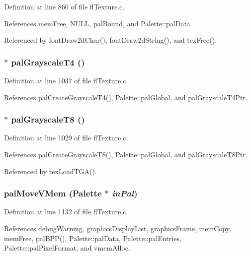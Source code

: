 Definition at line 860 of file fl\-Texture.c.

References mem\-Free, NULL, pal\-Bound, and Palette::pal\-Data.

Referenced by font\-Draw2d\-Char(), font\-Draw2d\-String(), and tex\-Free().
\subsubsection{$\ast$ pal\-Grayscale\-T4 ()}\label{flTexture_8c_da86a59d2bc5f0c599fa03520fddf2d1}




Definition at line 1037 of file fl\-Texture.c.

References pal\-Create\-Grayscale\-T4(), Palette::pal\-Global, and pal\-Grayscale\-T4Ptr.
\subsubsection{$\ast$ pal\-Grayscale\-T8 ()}\label{flTexture_8c_113e5035bc82299348d36164c91e76c6}




Definition at line 1029 of file fl\-Texture.c.

References pal\-Create\-Grayscale\-T8(), Palette::pal\-Global, and pal\-Grayscale\-T8Ptr.

Referenced by tex\-Load\-TGA().
\subsubsection{ pal\-Move\-VMem ({\bf Palette} $\ast$ {\em in\-Pal})}\label{flTexture_8c_9d39735408cff76e1af6a14b07c9e93f}




Definition at line 1132 of file fl\-Texture.c.

References debug\-Warning, graphics\-Display\-List, graphics\-Frame, mem\-Copy, mem\-Free, pal\-BPP(), Palette::pal\-Data, Palette::pal\-Entries, Palette::pal\-Pixel\-Format, and vmem\-Alloc.
